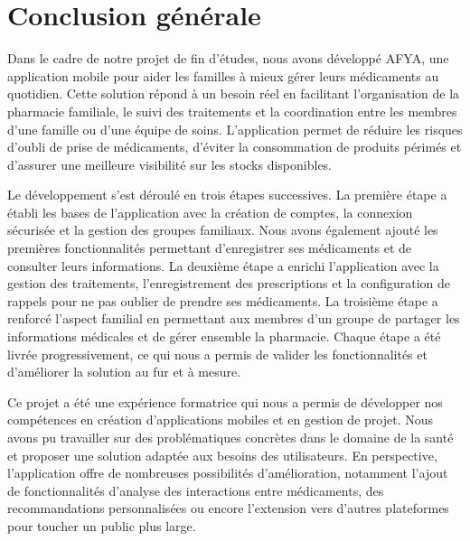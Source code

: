 \chapter*{Conclusion générale}

Dans le cadre de notre projet de fin d'études, nous avons développé AFYA, une application mobile pour aider les familles à mieux gérer leurs médicaments au quotidien. Cette solution répond à un besoin réel en facilitant l'organisation de la pharmacie familiale, le suivi des traitements et la coordination entre les membres d'une famille ou d'une équipe de soins. L'application permet de réduire les risques d'oubli de prise de médicaments, d'éviter la consommation de produits périmés et d'assurer une meilleure visibilité sur les stocks disponibles.

Le développement s'est déroulé en trois étapes successives. La première étape a établi les bases de l'application avec la création de comptes, la connexion sécurisée et la gestion des groupes familiaux. Nous avons également ajouté les premières fonctionnalités permettant d'enregistrer ses médicaments et de consulter leurs informations. La deuxième étape a enrichi l'application avec la gestion des traitements, l'enregistrement des prescriptions et la configuration de rappels pour ne pas oublier de prendre ses médicaments. La troisième étape a renforcé l'aspect familial en permettant aux membres d'un groupe de partager les informations médicales et de gérer ensemble la pharmacie. Chaque étape a été livrée progressivement, ce qui nous a permis de valider les fonctionnalités et d'améliorer la solution au fur et à mesure.

Ce projet a été une expérience formatrice qui nous a permis de développer nos compétences en création d'applications mobiles et en gestion de projet. Nous avons pu travailler sur des problématiques concrètes dans le domaine de la santé et proposer une solution adaptée aux besoins des utilisateurs. En perspective, l'application offre de nombreuses possibilités d'amélioration, notamment l'ajout de fonctionnalités d'analyse des interactions entre médicaments, des recommandations personnalisées ou encore l'extension vers d'autres plateformes pour toucher un public plus large.
